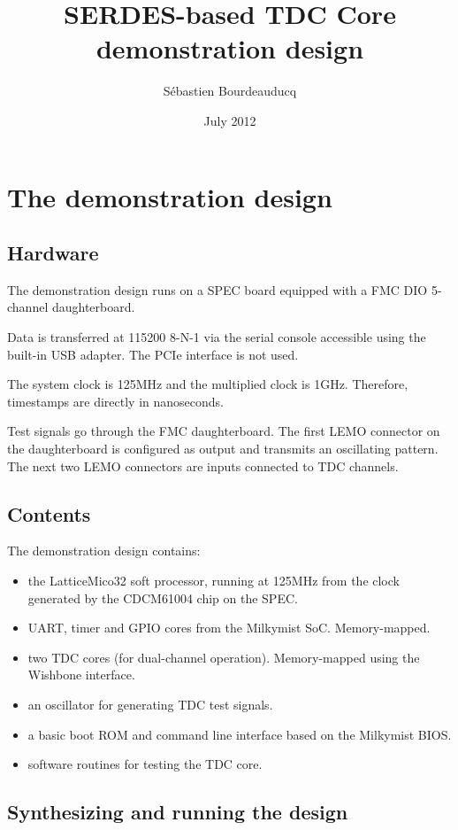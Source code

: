 \documentclass[a4paper,11pt]{article}
\title{SERDES-based TDC Core demonstration design}
\author{S\'ebastien Bourdeauducq}
\date{July 2012}
\begin{document}
\setlength{\parindent}{0pt}
\setlength{\parskip}{5pt}
\maketitle{}
\section{The demonstration design}
\subsection{Hardware}
The demonstration design runs on a SPEC board equipped with a FMC DIO 5-channel daughterboard.

Data is transferred at 115200 8-N-1 via the serial console accessible using the built-in USB adapter. The PCIe interface is not used.

The system clock is 125MHz and the multiplied clock is 1GHz. Therefore, timestamps are directly in nanoseconds.

Test signals go through the FMC daughterboard. The first LEMO connector on the daughterboard is configured as output and transmits an oscillating pattern. The next two LEMO connectors are inputs connected to TDC channels.

\subsection{Contents}
The demonstration design contains:
\begin{itemize}
\item the LatticeMico32 soft processor, running at 125MHz from the clock generated by the CDCM61004 chip on the SPEC.
\item UART, timer and GPIO cores from the Milkymist SoC. Memory-mapped.
\item two TDC cores (for dual-channel operation). Memory-mapped using the Wishbone interface.
\item an oscillator for generating TDC test signals.
\item a basic boot ROM and command line interface based on the Milkymist BIOS.
\item software routines for testing the TDC core.
\end{itemize}

\subsection{Synthesizing and running the design}
\end{document}
